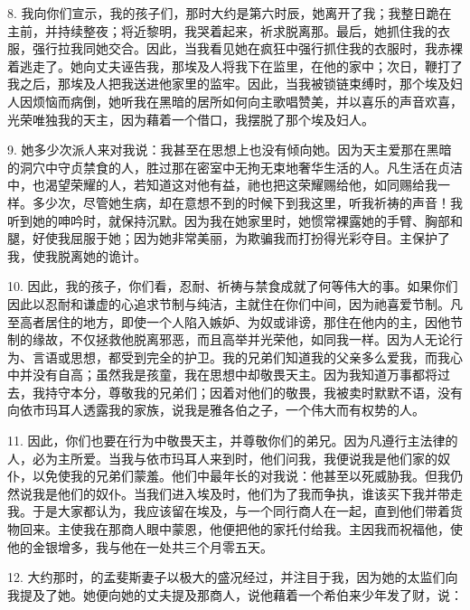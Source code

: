 8. 我向你们宣示，我的孩子们，那时大约是第六时辰，她离开了我；我整日跪在主前，并持续整夜；将近黎明，我哭着起来，祈求脱离那。最后，她抓住我的衣服，强行拉我同她交合。因此，当我看见她在疯狂中强行抓住我的衣服时，我赤裸着逃走了。她向丈夫诬告我，那埃及人将我下在监里，在他的家中；次日，鞭打了我之后，那埃及人把我送进他家里的监牢。因此，当我被锁链束缚时，那个埃及妇人因烦恼而病倒，她听我在黑暗的居所如何向主歌唱赞美，并以喜乐的声音欢喜，光荣唯独我的天主，因为藉着一个借口，我摆脱了那个埃及妇人。\par

9. 她多少次派人来对我说：我甚至在思想上也没有倾向她。因为天主爱那在黑暗的洞穴中守贞禁食的人，胜过那在密室中无拘无束地奢华生活的人。凡生活在贞洁中，也渴望荣耀的人，若知道这对他有益，祂也把这荣耀赐给他，如同赐给我一样。多少次，尽管她生病，却在意想不到的时候下到我这里，听我祈祷的声音！我听到她的呻吟时，就保持沉默。因为我在她家里时，她惯常裸露她的手臂、胸部和腿，好使我屈服于她；因为她非常美丽，为欺骗我而打扮得光彩夺目。主保护了我，使我脱离她的诡计。\par

10. 因此，我的孩子，你们看，忍耐、祈祷与禁食成就了何等伟大的事。如果你们因此以忍耐和谦虚的心追求节制与纯洁，主就住在你们中间，因为祂喜爱节制。凡至高者居住的地方，即使一个人陷入嫉妒、为奴或诽谤，那住在他内的主，因他节制的缘故，不仅拯救他脱离邪恶，而且高举并光荣他，如同我一样。因为人无论行为、言语或思想，都受到完全的护卫。我的兄弟们知道我的父亲多么爱我，而我心中并没有自高；虽然我是孩童，我在思想中却敬畏天主。因为我知道万事都将过去，我持守本分，尊敬我的兄弟们；因着对他们的敬畏，我被卖时默默不语，没有向依市玛耳人透露我的家族，说我是雅各伯之子，一个伟大而有权势的人。\par

11. 因此，你们也要在行为中敬畏天主，并尊敬你们的弟兄。因为凡遵行主法律的人，必为主所爱。当我与依市玛耳人来到时，他们问我，我便说我是他们家的奴仆，以免使我的兄弟们蒙羞。他们中最年长的对我说：他甚至以死威胁我。但我仍然说我是他们的奴仆。当我们进入埃及时，他们为了我而争执，谁该买下我并带走我。于是大家都认为，我应该留在埃及，与一个同行商人在一起，直到他们带着货物回来。主使我在那商人眼中蒙恩，他便把他的家托付给我。主因我而祝福他，使他的金银增多，我与他在一处共三个月零五天。\par

12. 大约那时，的孟斐斯妻子以极大的盛况经过，并注目于我，因为她的太监们向我提及了她。她便向她的丈夫提及那商人，说他藉着一个希伯来少年发了财，说：\par

